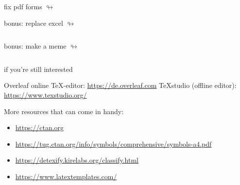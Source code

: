 \documentclass[usenames,dvipsnames]{beamer}
\begin{document}
\begin{frame}{fix pdf forms}
\hfill\href{https://www.youtube.com/watch?v=xvFZjo5PgG0}{$\looparrowright$}
\vspace{-1.2\baselineskip}
\end{frame}

\begin{frame}{bonus: replace excel}
\hfill\href{https://www.youtube.com/watch?v=xvFZjo5PgG0}{$\looparrowright$}
\vspace{-1.2\baselineskip}
\inputminted[linenos]{latex}{demos/chaos_table.tex}
\end{frame}

\begin{frame}{bonus: make a meme}
\hfill\href{https://www.youtube.com/watch?v=xvFZjo5PgG0}{$\looparrowright$}
\vspace{-1.2\baselineskip}
\inputminted[linenos]{latex}{demos/meme.tex}
\end{frame}

\begin{frame}{if you're still interested}
\begin{center}
Overleaf online TeX-editor: \url{https://de.overleaf.com}
\vfill
TeXstudio (offline editor): \url{https://www.texstudio.org/}
\end{center}
\vfill
More resources that can come in handy:
\small
\begin{itemize}
\item \url{https://ctan.org}
\item \url{https://tug.ctan.org/info/symbols/comprehensive/symbols-a4.pdf}
\item \url{https://detexify.kirelabs.org/classify.html}
\item \url{https://www.latextemplates.com/}
\end{itemize}
\end{frame}
\end{document}
